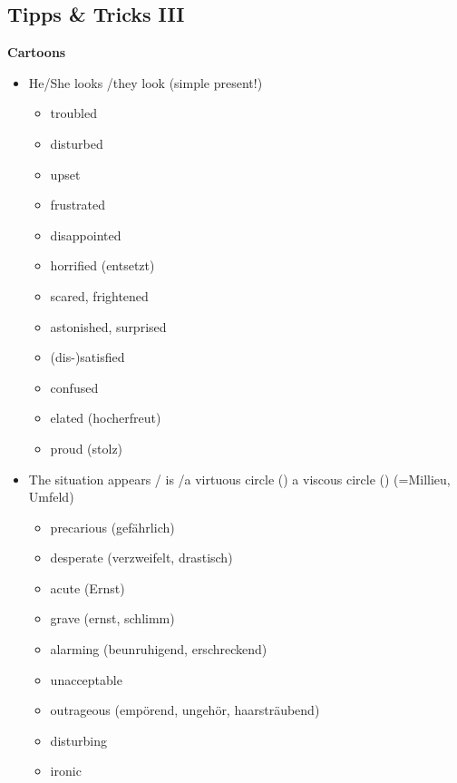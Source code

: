 \documentclass[a5paper,12pt,twoside,titlepage]{scrartcl}
\begin{document}
\subsection{Tipps \& Tricks III}
\textbf{Cartoons}
	\begin{itemize}
		\item He/She looks /they look (simple present!)
		\begin{itemize}
			\item troubled
			\item disturbed
			\item upset
			\item frustrated
			\item disappointed
			\item horrified (entsetzt)
			\item scared, frightened
			\item astonished, surprised
			\item (dis-)satisfied
			\item confused
			\item elated (hocherfreut)
			\item proud (stolz)
		\end{itemize}
		\item The situation appears / is /a virtuous circle (\smiley) a  viscous circle (\frownie) (=Millieu, Umfeld)
		\begin{itemize}
			\item precarious (gefährlich)
			\item desperate (verzweifelt, drastisch)
			\item acute (Ernst)
			\item grave (ernst, schlimm)
			\item alarming (beunruhigend, erschreckend)
			\item unacceptable
			\item outrageous (empörend, ungehör, haarsträubend)
			\item disturbing
			\item ironic
		\end{itemize}
	\end{itemize}
\newpage
\end{document}
